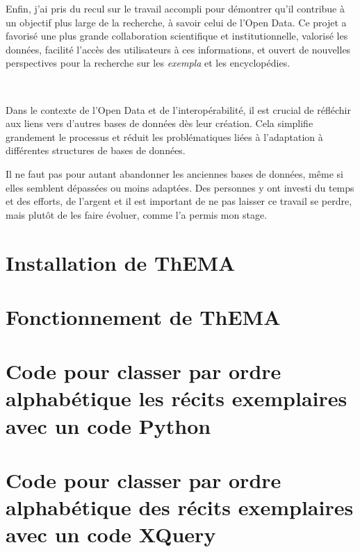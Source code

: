 \documentclass[a4paper,12pt,twoside]{book} %
\begin{document}
Enfin, j'ai pris du recul sur le travail accompli pour démontrer qu'il contribue à un objectif plus large de la recherche, à savoir celui de l'Open Data. Ce projet a favorisé une plus grande collaboration scientifique et institutionnelle, valorisé les données, facilité l'accès des utilisateurs à ces informations, et ouvert de nouvelles perspectives pour la recherche sur les \textit{exempla} et les encyclopédies.

\

Dans le contexte de l'Open Data et de l'interopérabilité, il est crucial de réfléchir aux liens vers d'autres bases de données dès leur création. Cela simplifie grandement le processus et réduit les problématiques liées à l'adaptation à différentes structures de bases de données.

Il ne faut pas pour autant abandonner les anciennes bases de données, même si elles semblent dépassées ou moins adaptées. Des personnes y ont investi du temps et des efforts, de l'argent et il est important de ne pas laisser ce travail se perdre, mais plutôt de les faire évoluer, comme l'a permis mon stage.


\newpage{\pagestyle{empty}\cleardoublepage}



\appendix %

\chapter[Installation de ThEMA]{Installation de ThEMA}

\pagestyle{empty}

\chapter[Fonctionnement de ThEMA]{Fonctionnement de ThEMA}

\pagestyle{empty}

\chapter[Code pour classer par ordre alphabétique des récits exemplaires avec un code Python]{Code pour classer par ordre alphabétique les récits exemplaires avec un code Python}

\pagestyle{empty}

\chapter[Code pour classer par ordre alphabétique des récits exemplaires avec un code \index{XQuery}XQuery]{Code pour classer par ordre alphabétique des récits exemplaires avec un code XQuery}

\pagestyle{empty}
\end{document}
